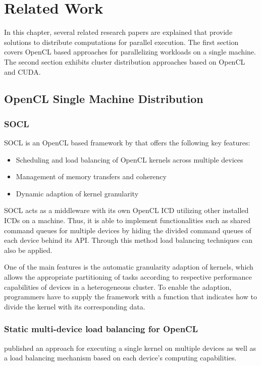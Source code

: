 \chapter{Related Work}
\label{related}
In this chapter, several related research papers are explained that provide solutions to distribute computations for parallel execution. The first section covers OpenCL based approaches for parallelizing workloads on a single machine. The second section exhibits cluster distribution approaches based on OpenCL and CUDA.

\section{OpenCL Single Machine Distribution}

\subsection*{SOCL}
SOCL is an OpenCL based framework by \citeauthor{socl} that offers the following key features\cite{socl}:
\begin{itemize}
    \item Scheduling and load balancing of OpenCL kernels across multiple devices
    \item Management of memory transfers and coherency
    \item Dynamic adaption of kernel granularity
\end{itemize}

SOCL acts as a middleware with its own OpenCL ICD utilizing other installed ICDs on a machine. Thus, it is able to implement functionalities such as shared command queues for multiple devices by hiding the divided command queues of each device behind its API. Through this method load balancing techniques can also be applied.

One of the main features is the automatic granularity adaption of kernels, which allows the appropriate partitioning of tasks according to respective performance capabilities of devices in a heterogeneous cluster. To enable the adaption, programmers have to supply the framework with a function that indicates how to divide the kernel with its corresponding data.

\subsection*{Static multi-device load balancing for OpenCL}
\citeauthor{delalama_2012} published an approach for executing a single kernel on multiple devices as well as a load balancing mechanism based on each device's computing capabilities\cite{delalama_2012}.

